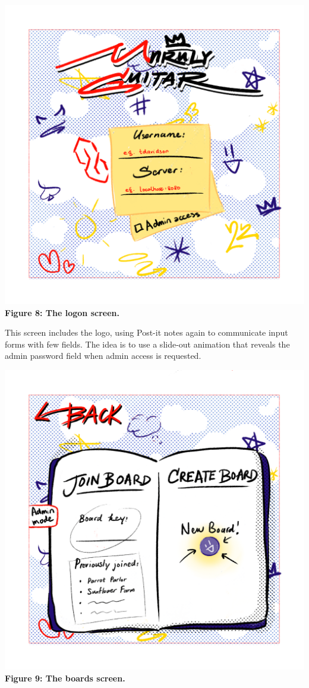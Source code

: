 \includegraphics[scale=0.8]{mocks/hue_mock_logon.png}
\textbf{Figure 8: The logon screen.}
\newline

This screen includes the logo, using Post-it notes again to communicate input forms with few fields. The idea is to use a slide-out animation that reveals the admin password field when admin access is requested.

\includegraphics[scale=0.8]{mocks/hue_mock_boards.png}
\textbf{Figure 9: The boards screen.}
\newline

